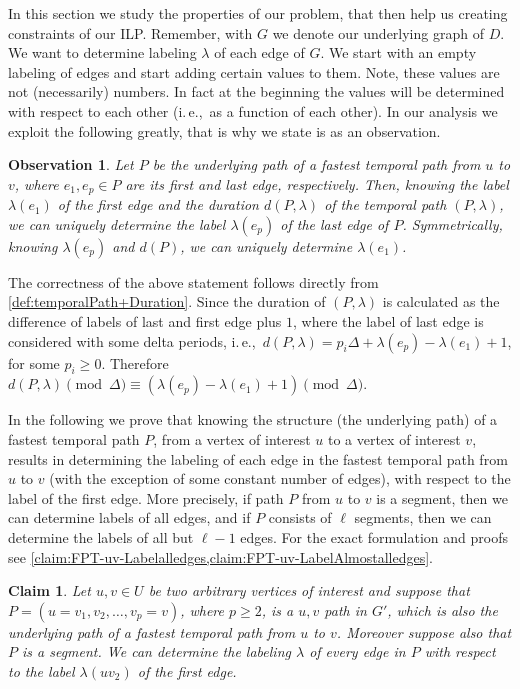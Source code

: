 \documentclass[11pt,a4paper]{article}
\newtheorem{observation}{Observation}
\newtheorem{claim}[theorem]{Claim}
\theoremstyle{remark}
\theoremstyle{definition}
\newcommand{\ie}{i.\,e.,\ }
\begin{document}
In this section we study the properties of our problem, that then help us creating constraints of our ILP.
Remember, with $G$ we denote our underlying graph of $D$. We want to determine labeling $\lambda$ of each edge of $G$.
We start with an empty labeling of edges and start adding certain values to them.
Note, these values are not (necessarily) numbers. 
In fact at the beginning the values will be determined with respect to each other (\ie as a function of each other).
In our analysis we exploit the following greatly, that is why we state is as an observation.

\begin{observation}\label{obs:FirstLabelAndDuration}
    Let $P$ be the underlying path of a fastest temporal path from $u$ to $v$, where $e_1, e_p \in P$ are its first and last edge, respectively.
    Then, knowing the label $\lambda (e_1)$ of the first edge and the duration $d(P,\lambda)$ of the temporal path $(P,\lambda)$, we can uniquely determine the label $\lambda (e_p)$ of the last edge of $P$.
    Symmetrically, knowing $\lambda(e_p)$ and $d(P)$, we can uniquely determine $\lambda(e_1)$.
\end{observation}
The correctness of the above statement follows directly from \cref{def:temporalPath+Duration}. Since the duration of $(P,\lambda)$ is calculated as the difference of labels of last and first edge plus $1$,
where the label of last edge is considered with some delta periods,
\ie $d(P,\lambda) = p_i \Delta + \lambda(e_p) - \lambda (e_1) + 1$, for some $p_i \geq 0$.
Therefore $d(P,\lambda) \pmod \Delta \equiv  (\lambda(e_p) - \lambda (e_1) + 1) \pmod \Delta$.

In the following we prove that knowing the structure (the underlying path) of a fastest temporal path $P$, from a vertex of interest $u$ to a vertex of interest $v$,
results in determining the labeling of each edge in the fastest temporal path from $u$ to $v$ 
(with the exception of some constant number of edges), with respect to the label of the first edge.
More precisely, if path $P$ from $u$ to $v$ is a segment, then we can determine labels of all edges,
and if $P$ consists of $\ell$ segments, then we can determine the labels of all but $\ell -1$ edges.
For the exact formulation and proofs see \cref{claim:FPT-uv-Labelalledges,claim:FPT-uv-LabelAlmostalledges}.

\begin{claim}\label{claim:FPT-uv-Labelalledges}
    Let $u, v \in U$ be two arbitrary vertices of interest and suppose that $P = (u=v_1,v_2, \dots, v_p = v)$, where $p \geq 2$, 
    is a $u,v$ path in $G'$, which is also the underlying path of a fastest temporal path from $u$ to $v$.
    Moreover suppose also that $P$ is a segment.
    We can determine the labeling $\lambda$ of every edge in $P$ with respect to the label $\lambda(uv_2)$ of the first edge.
\end{claim}
\end{document}
